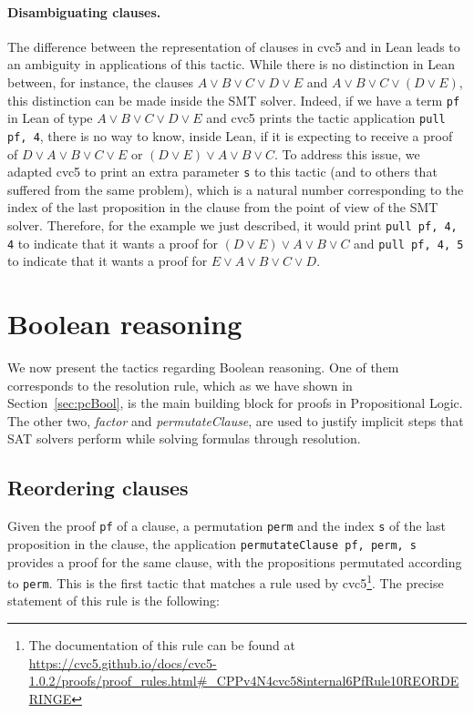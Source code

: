 \paragraph{Disambiguating clauses.} The difference between the representation of
clauses in cvc5 and in Lean leads to an ambiguity in applications of this tactic.
While there is no distinction in Lean between, for instance, the clauses $A \vee B \vee C \vee D \vee E$
and $A \vee B \vee C \vee (D \vee E)$, this distinction can be made inside the SMT solver. Indeed, if
we have a term \texttt{pf} in Lean of type $A \vee B \vee C \vee D \vee E$ and cvc5 prints the tactic
application \texttt{pull pf, 4}, there is no way to know, inside Lean, if it is expecting to receive
a proof of $D \vee A \vee B \vee C \vee E$ or $(D \vee E) \vee A \vee B \vee C$. To address this issue,
we adapted cvc5 to print an extra parameter \texttt{s} to this tactic (and to others that suffered from the same problem),
which is a natural number corresponding to the index of the last proposition in the clause from the
point of view of the SMT solver. Therefore, for the example we just described, it would print
\texttt{pull pf, 4, 4} to indicate that it wants a proof for $(D \vee E) \vee A \vee B \vee C$ and
\texttt{pull pf, 4, 5} to indicate that it wants a proof for $E \vee A \vee B \vee C \vee D$.

\section{Boolean reasoning}

We now present the tactics regarding Boolean reasoning. One of them corresponds to
the resolution rule, which as we have shown in Section~\ref{sec:pcBool}, is the main
building block for proofs in Propositional Logic. The other two, \textit{factor} and
\textit{permutateClause}, are used to justify implicit steps that SAT solvers
perform while solving formulas through resolution.

\subsection*{Reordering clauses}

Given the proof \texttt{pf} of a clause, a permutation \texttt{perm} and the index \texttt{s} of the last
proposition in the clause, the application \texttt{permutateClause pf, perm, s} provides a proof for the same clause, with
the propositions permutated according to \texttt{perm}.
This is the first tactic that matches a rule used by cvc5\footnote{The documentation of this rule can be found at \url{https://cvc5.github.io/docs/cvc5-1.0.2/proofs/proof\_rules.html\#\_CPPv4N4cvc58internal6PfRule10REORDERINGE}}. The precise statement
of this rule is the following:

